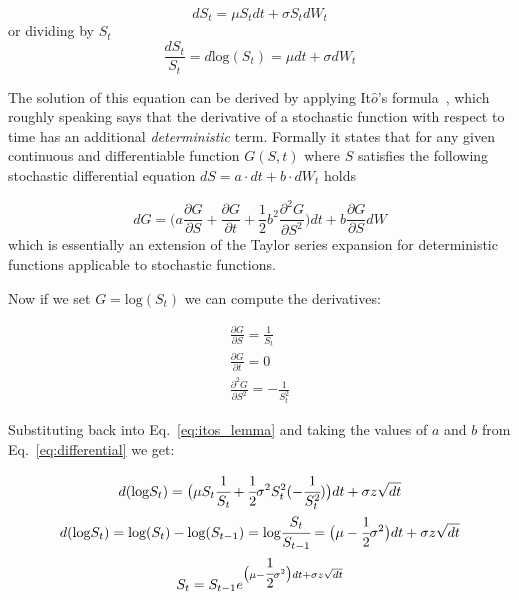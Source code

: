 \begin{equation}
dS_t = \mu S_t dt + \sigma S_t dW_t
\label{eq:differential}
\end{equation}
or dividing by $S_t$
\begin{equation}
\frac{dS_t}{S_t} = d\textrm{log}(S_t) = \mu dt + \sigma dW_t
\end{equation}

The solution of this equation can be derived by applying
It\(\hat{o}\)'s formula~\cite{bib:ito_lemma}, which roughly speaking says
that the derivative of a stochastic function with respect to time has 
an additional \emph{deterministic} term. Formally it states that for any given 
continuous and differentiable function 
\(G(S, t)\) where \(S\) satisfies the following stochastic differential
equation \(dS=a\cdot dt +b\cdot dW_t\) holds

\begin{equation}
dG=\big(a\frac{\partial G}{\partial S} + \frac{\partial G}{\partial t} + \frac{1}{2}b^2\frac{\partial^2 G}{\partial S^2} \big)dt + b \frac{\partial G}{\partial S}dW
\label{eq:itos_lemma}
\end{equation}
which is essentially an extension of the Taylor series expansion for deterministic functions applicable to stochastic functions.

Now if we set \(G = \textrm{log}(S_t)\) we can compute the derivatives:

\begin{equation}
\begin{gathered}
\frac{\partial G}{\partial S} = \frac{1}{S_t}\\
\frac{\partial G}{\partial t} = 0\\
\frac{\partial^2 G}{\partial S^2} = -\frac{1}{S_t^{2}}
\end{gathered}
\end{equation}

Substituting back into Eq.~\ref{eq:itos_lemma} and taking the values of $a$ and $b$ from Eq.~\ref{eq:differential} we get:

\begin{equation}
\begin{gathered}
d(\textrm{log} S_t) = \big(\mu S_t \cfrac{1}{S_t} + \cfrac{1}{2}\sigma^2 S_t^2 (-\cfrac{1}{S_t^2})\big)dt + \sigma z\sqrt{dt}\\
d(\textrm{log} S_t) = \textrm{log} (S_t) - \textrm{log} (S_{t-1}) = \textrm{log} \cfrac{S_t}{S_{t-1}} = \big(\mu - \cfrac{1}{2}\sigma^2\big)dt + \sigma z\sqrt{dt}\\
S_t = S_{t-1}e^{\big(\mu - \cfrac{1}{2}\sigma^2\big)dt + \sigma z\sqrt{dt}}
\end{gathered}
\label{eq:gbm_solution}
\end{equation}

